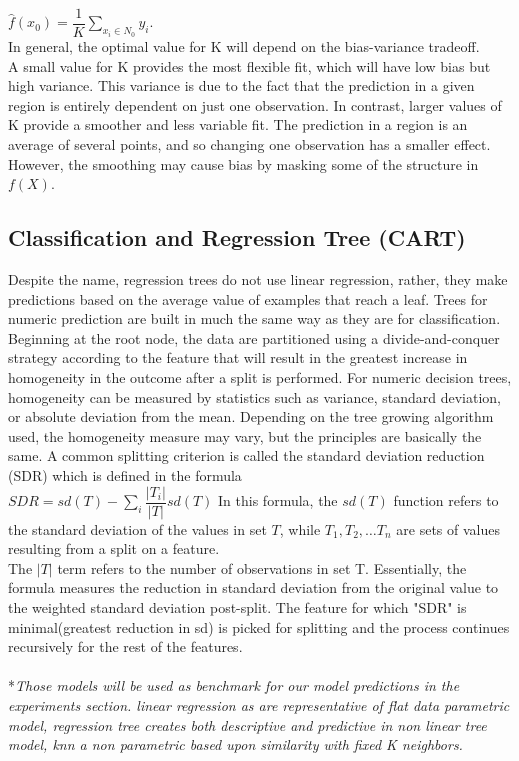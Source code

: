 \documentclass[a4paper]{article}
\begin{document}
$\hat f(x_0) = \dfrac{1}{K} \sum\limits_{x_i \in N_0} y_i.$\\
 In general, the optimal value
for K will depend on the bias-variance tradeoff. \\
A small value for K provides the most flexible fit, which will have low bias but high variance. This variance is due to the fact that the prediction in a given region is entirely dependent on just one observation.
In contrast, larger values of K provide a smoother and less variable fit. The
prediction in a region is an average of several points, and so changing one observation has a smaller effect. However, the smoothing may cause bias by masking some of the structure in $f(X)$.

\subsection{Classification and Regression Tree (CART)}
Despite the name, regression trees do not use linear regression, rather, they make predictions based on the average value of examples that reach a leaf.
Trees for numeric prediction are built in much the same way as they are for classification. Beginning at the root node, the data are partitioned using a divide-and-conquer strategy according to the feature that will result in the greatest increase in homogeneity in the outcome after a split is performed.  For numeric decision trees, homogeneity can be measured by statistics such as variance, standard deviation, or absolute deviation from the mean. Depending on the tree growing algorithm used, the homogeneity measure may vary, but the principles are basically the same.
A common splitting criterion is called the standard deviation reduction (SDR) which is defined in the formula\\
$SDR = sd(T) - \sum\limits_{i}\dfrac{|T_i|}{|T|} sd(T)$
In this formula, the $sd(T)$ function refers to the standard deviation of the values in set $T$, while $T_1 , T_2 , … T_n$ are sets of values resulting from a split on a feature.\\ The $|T|$ term refers to the number of observations in set T. Essentially, the formula measures the reduction in standard deviation from the original value to the weighted standard deviation post-split.
The feature for which "SDR" is minimal(greatest reduction in sd) is picked
for splitting and the process continues recursively for the rest of the features.
\\
\\
*\emph{Those models will be used as benchmark for our model predictions in the experiments section.
linear regression as are representative of flat data parametric model,
regression tree creates both descriptive and predictive in non linear tree model, knn a non parametric based upon similarity with fixed K neighbors.
}
\end{document}
